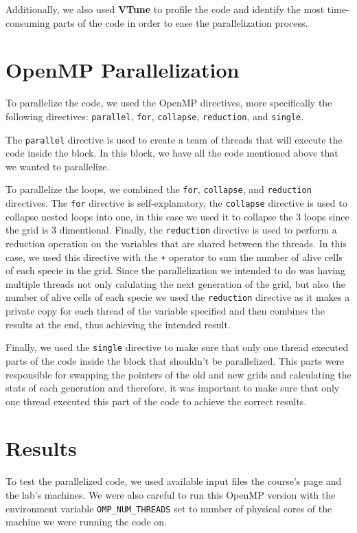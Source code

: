 \documentclass{article}
\begin{document}
Additionally, we also used \textbf{VTune} to profile the code and 
identify the most time-consuming parts of the code in order to ease 
the parallelization process.

\section{OpenMP Parallelization}
To parallelize the code, we used the OpenMP directives, more specifically  
the following directives: \texttt{parallel}, \texttt{for}, \texttt{collapse}, 
\texttt{reduction}, and \texttt{single}.

The \texttt{parallel} directive is used to create a team of threads 
that will execute the code inside the block. In this block, we have 
all the code mentioned above that we wanted to parallelize. 

To parallelize the loops, we combined the \texttt{for}, \texttt{collapse}, 
and \texttt{reduction} directives. The \texttt{for} directive is self-explanatory, 
the \texttt{collapse} directive is used to collapse nested loops into one, in 
this case we used it to collapse the 3 loops since the grid is 3 dimentional.
Finally, the \texttt{reduction} directive is used to perform a reduction 
operation on the variables that are shared between the threads. In this case, we 
used this directive with the \texttt{+} operator to sum the number of alive cells 
of each specie in the grid. Since the parallelization we intended to do was having 
multiple threads not only calulating the next generation of the grid, but also the 
number of alive cells of each specie we used the \texttt{reduction} directive as it 
makes a private copy for each thread of the variable specified and then combines 
the results at the end, thus achieving the intended result. 

Finally, we used the \texttt{single} directive to make sure that only one thread 
executed parts of the code inside the block that shouldn't be parallelized. This 
parts were responsible for swapping the pointers of the old and new grids and calculating the 
stats of each generation and therefore, it was important to make sure that only 
one thread executed this part of the code to achieve the correct results.

\section{Results}

To test the parallelized code, we used available input files the course's page 
and the lab's machines. We were also careful to run this OpenMP version with the 
environment variable \texttt{OMP\_NUM\_THREADS} set to number of physical cores 
of the machine we were running the code on. 
\end{document}
